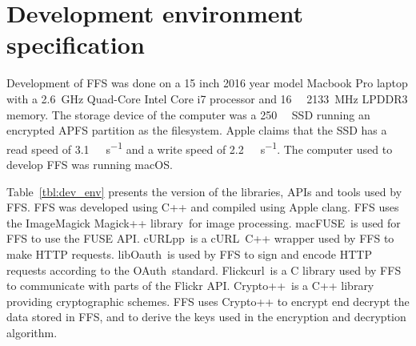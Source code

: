 \section{Development environment specification}
\label{sec:dev_env}
Development of \gls{FFS} was done on a 15 inch 2016 year model Macbook Pro laptop with a \SI{2.6}{\giga\hertz} \mbox{Quad-Core} Intel Core i7 processor and \SI{16}{\giga\byte} \SI{2133}{\mega\hertz} LPDDR3 memory. The storage device of the computer was a \SI{250}{\giga\byte} \gls{SSD} running an encrypted \gls{APFS} partition as the filesystem. Apple claims that the \gls{SSD} has a read speed of \SI[per-mode = symbol]{3.1}{\giga\byte\per\second} and a write speed of \SI[per-mode = symbol]{2.2}{\giga\byte\per\second}. The computer used to develop FFS was running macOS.

Table~\ref{tbl:dev_env} presents the version of the libraries, APIs and tools used by FFS. FFS was developed using C++ and compiled using Apple clang. \gls{FFS} uses the ImageMagick Magick++ library\,\cite{ImageMagick2022} for image processing. macFUSE\,\cite{HomeMacFUSE} is used for \gls{FFS} to use the \gls{FUSE} \gls{API}. cURLpp\,\cite{barrette-lapierreCURLpp2022} is a cURL\,\cite{CurlCurl2022} C++ wrapper used by \gls{FFS} to make HTTP requests. libOauth\,\cite{Liboauth} is used by \gls{FFS} to sign and encode HTTP requests according to the OAuth\,\cite{barrette-lapierreCURLpp2022} standard. Flickcurl\,\cite{beckettFlickcurlLibraryFlickr} is a C library used by \gls{FFS} to communicate with parts of the Flickr \gls{API}. Crypto++\,\cite{CryptoLibraryFree} is a C++ library providing cryptographic schemes. \gls{FFS} uses Crypto++ to encrypt end decrypt the data stored in \gls{FFS}, and to derive the keys used in the encryption and decryption algorithm. 


